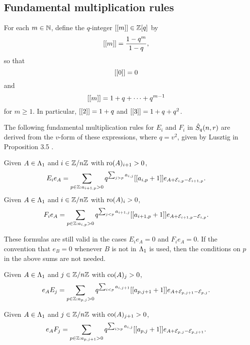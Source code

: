 \documentclass[a4paper, 11pt, twoside]{report}
\begin{document}
\subsection{Fundamental multiplication rules}

For each $m\in\mathbb{N}$, define the $q$-integer $[[m]]\in\mathbb{Z}[q]$ by
\begin{equation*}
[[m]] = \frac{1-q^m}{1-q},
\end{equation*}
so that
\begin{equation*}
[[0]] = 0
\end{equation*}
and
\begin{equation*}
[[m]] = 1+q+\cdots +q^{m-1}
\end{equation*}
for $m\geq 1$. In particular, $[[2]]=1+q$ and $[[3]]=1+q+q^2$.

The following fundamental multiplication rules for $E_i$ and $F_i$ in $\hat{S}_q(n,r)$ are derived from the $v$-form of these expressions, where $q=v^2$, given by Lusztig in Proposition 3.5 \cite{lusztig99}.

\begin{lemma}\label{lemma:fundamental-multiplication-rule}
Given $A\in\Lambda_1{}$ and $i\in\mathbb{Z}/{n \mathbb{Z}}$ with $\operatorname{ro}(A)_{i+1}>0$,
\begin{equation*}
E_ie_A = \sum_{p\in\mathbb{Z}:a_{i+1,p}>0} q^{\sum_{j>p}a_{i,j}} [[a_{i,p}+1]] e_{A+\mathcal{E}_{i,p} -\mathcal{E}_{i+1,p}}.
\end{equation*}
Given $A\in\Lambda_1{}$ and $i\in\mathbb{Z}/{n \mathbb{Z}}$ with $\operatorname{ro}(A)_i>0$,
\begin{equation*}
F_ie_A = \sum_{p\in\mathbb{Z}:a_{i,p}>0} q^{\sum_{j<p}a_{i+1,j}} [[a_{i+1,p}+1]] e_{A+\mathcal{E}_{i+1,p} -\mathcal{E}_{i,p}}.
\end{equation*}
\end{lemma}

These formulas are still valid in the cases $E_ie_A=0$ and $F_ie_A=0$. If the convention that $e_B = 0$ whenever $B$ is not in $\Lambda_1{}$ is used, then the conditions on $p$ in the above sums are not needed.

\begin{corollary}\label{corollary:fundamental-right-multiplication-rules}
Given $A\in\Lambda_1{}$ and $j\in\mathbb{Z}/{n \mathbb{Z}}$ with $\operatorname{co}(A)_{j}>0$,
\begin{equation*}
e_AE_j = \sum_{p\in\mathbb{Z}: a_{p,j}>0} q^{\sum_{i<p} a_{i,j+1}} [[a_{p,j+1}+1]] e_{A+\mathcal{E}_{p,j+1}-\mathcal{E}_{p,j}}.
\end{equation*}

Given $A\in\Lambda_1{}$ and $j\in\mathbb{Z}/{n \mathbb{Z}}$ with $\operatorname{co}(A)_{j+1}>0$,
\begin{equation*}
e_AF_j = \sum_{p\in\mathbb{Z}: a_{p,j+1}>0} q^{\sum_{i>p}a_{i,j}} [[a_{p,j}+1]] e_{A+\mathcal{E}_{p,j}-\mathcal{E}_{p,j+1}}.
\end{equation*}
\end{corollary}
\end{document}
